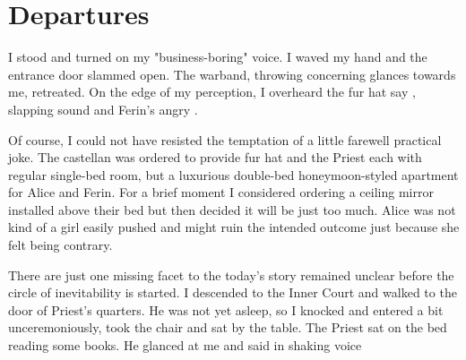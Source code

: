 \section{Departures}

I stood and turned on my "business-boring" voice.  I waved my hand and the entrance door slammed open. The warband, throwing concerning glances towards me, retreated. On the edge of my perception, I overheard the fur hat say , slapping sound and Ferin's angry .

Of course, I could not have resisted the temptation of a little farewell practical joke. The castellan was ordered to provide fur hat and the Priest each with regular single-bed room, but a luxurious double-bed honeymoon-styled apartment for Alice and Ferin. For a brief moment I considered ordering a ceiling mirror installed above their bed but then decided it will be just too much. Alice was not kind of a girl easily pushed and might ruin the intended outcome just because she felt being contrary.

There are just one missing facet to the today's story remained unclear before the circle of inevitability is started. I descended to the Inner Court and walked to the door of Priest's quarters. He was not yet asleep, so I knocked and entered a bit unceremoniously, took the chair and sat by the table. The Priest sat on the bed reading some books. He glanced at me and said in shaking voice




